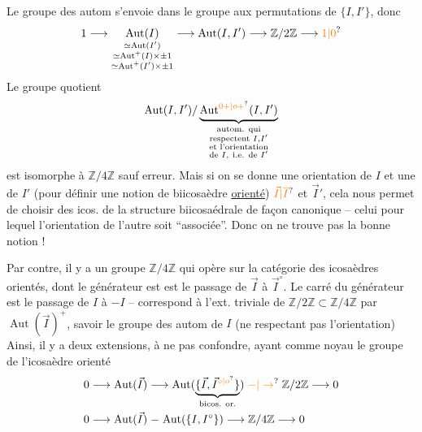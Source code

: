 Le groupe des autom s'envoie dans
le groupe aux  permutations de $\{I,I'\}$, donc
\[
1\longrightarrow
\underset{\substack{\simeq\operatorname{Aut}(I')\\
\simeq\operatorname{Aut}^{+}(I)\times\pm1\\
\simeq\operatorname{Aut}^{+}(I')\times\pm1}}{\operatorname{Aut}(I)}
\longrightarrow\operatorname{Aut}(I,I')\longrightarrow\mathbb Z/2\mathbb Z
\longrightarrow\unsure{1|0}
\]
Le groupe quotient
\[
\operatorname{Aut}(I,I')/
\underbrace{\operatorname{Aut}^{\unsure{0+|o+}}(I,I')}_{
\substack{\text{autom. qui}\\\text{respectent }I,I'\\\text{et l'orientation}\\
\text{de }I,\ \text{i.e. de }I'}}
\]
est isomorphe à \uline{$\mathbb Z/4\mathbb Z$} sauf erreur.
Mais si on  se donne une
 
orientation de $I$ et une de $I'$ (pour
définir une notion de biicosaèdre \uline{orienté})
 $\unsure{\vec I|\overline I}$ et $\vec I'$, cela nous permet
de choisir  des icos. de la structure
biicosaédrale de façon canonique -- 
celui pour lequel l'orientation de l'autre
soit ``associée''. Donc on ne trouve pas
la bonne notion !

Par contre, il y a un groupe $\mathbb Z/4\mathbb Z$
qui opère sur la catégorie des
icosaèdres orientés, dont le générateur est
 est le passage de $\vec I$ à $\vec I^\circ$.
Le carré du générateur est le passage
de $I$ à $-I$ -- correspond à l'ext.
triviale de $\mathbb Z/2\mathbb Z\subset\mathbb Z/4\mathbb Z$ par
$\operatorname{Aut}(\vec I)^+$, savoir le groupe des autom
de  $I$ (ne respectant pas l'orientation)
Ainsi, il y a deux extensions, à ne pas
confondre, ayant comme noyau le
groupe de l'icosaèdre orienté
\[
\begin{aligned}
0\longrightarrow\operatorname{Aut}(\vec I)&\longrightarrow
 \operatorname{Aut}(\underbrace{\{\vec I,\vec I^{\unsure{\circ|o}}\}}_{\text{bicos. or.}})
 \mathrel{\unsure{-|\to}}\mathbb Z/2\mathbb Z\longrightarrow0\\
0\longrightarrow\operatorname{Aut}(\vec I)&\mathrel{-}
 \operatorname{Aut}(\{I,I^\circ\})\longrightarrow\mathbb Z/4\mathbb Z\longrightarrow0
\end{aligned}
\]

